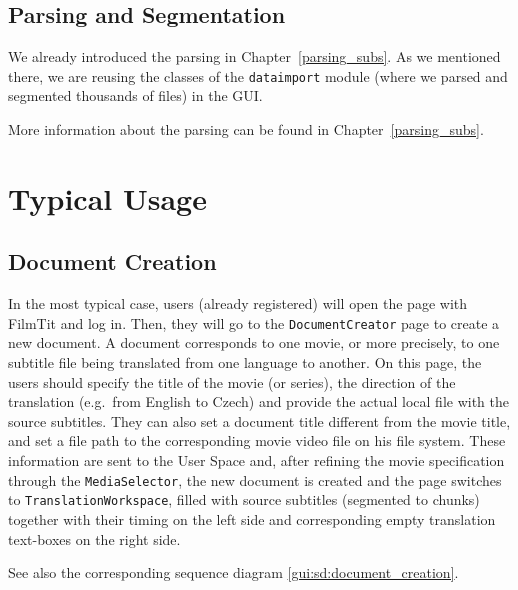 \subsection{Parsing and Segmentation}
We already introduced the parsing in Chapter~\ref{parsing_subs}. As we mentioned there, we are reusing the classes of the {\tt dataimport} module (where we parsed and segmented thousands of files) in the GUI.

More information about the parsing can be found in Chapter~\ref{parsing_subs}.

\section{Typical Usage}

\subsection{Document Creation}

In the most typical case, users (already registered) will open the page with FilmTit and log in. Then, they will go to the {\tt DocumentCreator} page to create a new document. A document corresponds to one movie, or more precisely, to one subtitle file being translated from one language to another. On this page, the users should specify the title of the movie (or series), the direction of the translation (e.g.\ from English to Czech) and provide the actual local file with the source subtitles. They can also set a document title different from the movie title, and set a file path to the corresponding movie video file on his file system.
These information are sent to the User Space and, after refining the movie specification through the {\tt MediaSelector}, the new document is created and the page switches to {\tt TranslationWorkspace}, filled with source subtitles (segmented to chunks) together with their timing on the left side and corresponding empty translation text-boxes on the right side.

See also the corresponding sequence diagram \ref{gui:sd:document_creation}.


